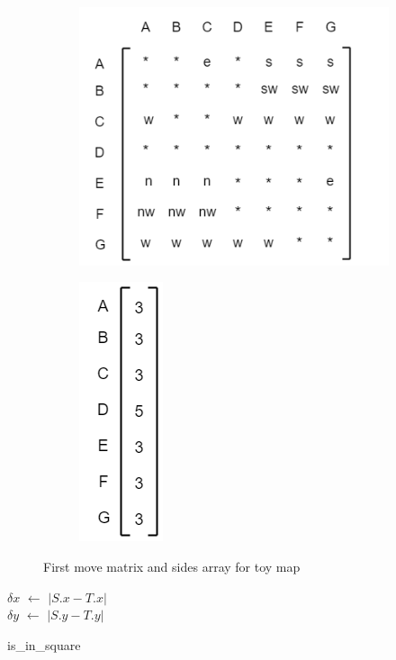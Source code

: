 \begin{figure}[h]
      \centering
      \begin{subfigure}{.35\columnwidth}
      \centering
      \includegraphics[width=.9\columnwidth]{cpd_square.png}
        \caption{}
        \label{fig:results_1}
      \end{subfigure}%
      \begin{subfigure}{.35\columnwidth}
      \includegraphics[width=.25\columnwidth]{sides_array.png}
      \centering
        \caption{}
        \label{fig:results_2}
      \end{subfigure}
      \caption{\small First move matrix and sides array for toy map}
      \label{fig:results}
    \end{figure}





\begin{algorithm}
$\delta x$ $\gets$ $|S.x - T.x|$\\
$\delta y$ $\gets$ $|S.y - T.y|$\\
\caption{is\_in\_square}\label{alg:1}
\end{algorithm}

 
